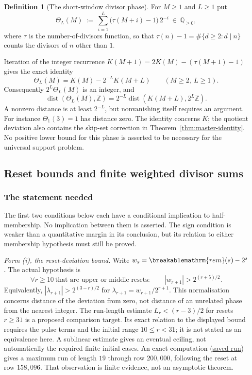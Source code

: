 \documentclass[11pt]{article}
\theoremstyle{plain}
\theoremstyle{definition}
\newtheorem{defn}[thm]{Definition}
\theoremstyle{remark}
\renewcommand{\mathrm}[1]{\ifmmode\breakablemathrm{#1}\else\textrm{#1}\fi}%
\newcommand{\Q}{\mathbb{Q}}
\begin{document}
\begin{defn}[The short-window divisor phase]
\label{defn:theta}
For $M\ge 1$ and $L\ge 1$ put
\[
\Theta_L(M)\ :=\ \sum_{i=1}^{L}\bigl(\tau(M+i)-1\bigr)\,2^{-i}\ \in\ \Q_{\ge 0},
\]
where $\tau$ is the number-of-divisors function, so that $\tau(n)-1=\#\{d\ge 2: d\mid n\}$ counts
the divisors of $n$ other than $1$.
\end{defn}

Iteration of the integer recurrence
$K(M+1)=2K(M)-(\tau(M+1)-1)$ gives the exact identity
\[
 \Theta_L(M)=K(M)-2^{-L}K(M+L)\qquad(M\ge2,\ L\ge1).
\]
Consequently $2^L\Theta_L(M)$ is an integer, and
\[
 \operatorname{dist}(\Theta_L(M),\mathbb Z)
 =2^{-L}\operatorname{dist}(K(M+L),2^L\mathbb Z).
\]
A nonzero distance is at least $2^{-L}$, but nonvanishing itself
requires an argument.  For instance $\Theta_1(3)=1$ has distance
zero.  The identity concerns $K$; the quotient deviation also
contains the skip-set correction in
Theorem~\ref{thm:master-identity}.  No positive lower bound for
this phase is asserted to be necessary for the universal support
problem.

\subsection{Reset bounds and finite weighted divisor sums}
\label{sec:invent-R1}

\subsubsection*{The statement needed}

The first two conditions below each have a conditional implication to
half-membership.  No implication between them is asserted.  The sign
condition is weaker than a quantitative margin in its conclusion,
but its relation to either membership hypothesis must still be
proved.

\emph{Form (i), the reset-deviation bound.} Write
$w_s=\mathrm{rem}(s)-2^s$.  The actual hypothesis is
\[
 \forall r\ge10\ \text{that are upper or middle resets}:\qquad
 |w_{r+1}|>2^{(r+5)/2}.
\]
Equivalently, $|\lambda_{r+1}|>2^{(3-r)/2}$ for
$\lambda_{r+1}=w_{r+1}/2^{r+1}$.  This normalisation concerns
distance of the deviation from zero, not distance of an unrelated
phase from the nearest integer.
The run-length estimate $L_r<(r-3)/2$ for resets $r\ge31$ is a
proposed comparison target.  Its exact relation to the displayed
bound requires the pulse terms and the initial range $10\le r<31$;
it is not stated as an equivalence here.  A sublinear estimate gives
an eventual ceiling, not automatically the required finite initial
cases.  An exact computation
(\href{https://github.com/wcook04/plectis-erdos/blob/f757115e03bebe5c04431a147da559015c680a37/research/experiments/erdos257/receipts/seam-orbit-200000.json}{saved run})
gives a maximum run of length
$19$ through row $200{,}000$, following the reset at row $158{,}096$.
That observation is finite evidence, not an asymptotic theorem.
\end{document}
